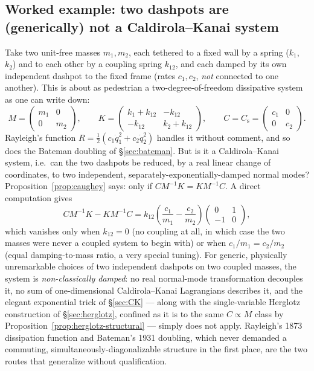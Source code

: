 \documentclass[12pt]{book}
\theoremstyle{definition}
\theoremstyle{remark}
\newcommand{\Mm}{M}
\newcommand{\Kk}{K}
\newcommand{\Cc}{C}
\newcommand{\Cs}{C_{\mathrm s}}
\begin{document}
\subsection*{Worked example: two dashpots are (generically) not a Caldirola--Kanai system}

Take two unit-free masses $m_1,m_2$, each tethered to a fixed wall by a spring ($k_1$, $k_2$) and to each other by a coupling spring $k_{12}$, and each damped by its own independent dashpot to the fixed frame (rates $c_1,c_2$, \emph{not} connected to one another). This is about as pedestrian a two-degree-of-freedom dissipative system as one can write down:
\[
\Mm=\begin{pmatrix}m_1&0\\0&m_2\end{pmatrix},\qquad
\Kk=\begin{pmatrix}k_1+k_{12}&-k_{12}\\-k_{12}&k_2+k_{12}\end{pmatrix},\qquad
\Cc=\Cs=\begin{pmatrix}c_1&0\\0&c_2\end{pmatrix}.
\]
Rayleigh's function $R=\tfrac12(c_1\dot q_1^2+c_2\dot q_2^2)$ handles it without comment, and so does the Bateman doubling of \S\ref{sec:bateman}. But is it a Caldirola--Kanai system, i.e.\ can the two dashpots be reduced, by a real linear change of coordinates, to two independent, separately-exponentially-damped normal modes? Proposition~\ref{prop:caughey} says: only if $\Cc\Mm^{-1}\Kk=\Kk\Mm^{-1}\Cc$. A direct computation gives
\[
\Cc\Mm^{-1}\Kk-\Kk\Mm^{-1}\Cc = k_{12}\left(\frac{c_1}{m_1}-\frac{c_2}{m_2}\right)\begin{pmatrix}0&1\\-1&0\end{pmatrix},
\]
which vanishes only when $k_{12}=0$ (no coupling at all, in which case the two masses were never a coupled system to begin with) or when $c_1/m_1=c_2/m_2$ (equal damping-to-mass ratio, a very special tuning). For generic, physically unremarkable choices of two independent dashpots on two coupled masses, the system is \emph{non-classically damped}: no real normal-mode transformation decouples it, no sum of one-dimensional Caldirola--Kanai Lagrangians describes it, and the elegant exponential trick of \S\ref{sec:CK} --- along with the single-variable Herglotz construction of \S\ref{sec:herglotz}, confined as it is to the same $\Cc\propto\Mm$ class by Proposition~\ref{prop:herglotz-structural} --- simply does not apply. Rayleigh's 1873 dissipation function and Bateman's 1931 doubling, which never demanded a commuting, simultaneously-diagonalizable structure in the first place, are the two routes that generalize without qualification.
\end{document}
